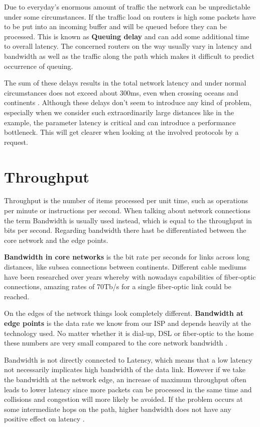 Due to everyday's enormous amount of traffic the network can be unpredictable under some circumstances. If the traffic load on routers is high some packets have to be put into an incoming buffer and will be queued before they can be processed. This is known as \textbf{Queuing delay} and can add some additional time to overall latency. The concerned routers on the way usually vary in latency and bandwidth as well as the traffic along the path which makes it difficult to predict occurrence of queuing.   

The sum of these delays results in the total network latency and under normal circumstances does not exceed about 300ms, even when crossing oceans and continents \cite{Grigorik_2013}. Although these delays don't seem to introduce any kind of problem, especially when we consider such extraordinarily large distances like in the example, the parameter latency is critical and can introduce a performance bottleneck. This will get clearer when looking at the involved protocols by a request.

\section{Throughput}
Throughput is the number of items processed per unit time, such as operations per minute or instructions per second. When talking about network connections the term Bandwidth is usually used instead, which is equal to the throughput in bits per second. 
Regarding bandwidth there hast be differentiated between the core network and the edge points. 

\textbf{Bandwidth in core networks} is the bit rate per seconds for links across long distances, like subsea connections between continents. Different cable mediums have been researched over years whereby with nowadays capabilities of fiber-optic connections, amazing rates of 70Tb/s for a single fiber-optic link could be reached.   

On the edges of the network things look completely different. \textbf{Bandwidth at edge points} is the data rate we know from our ISP and depends heavily at the technology used. No matter whether it is dial-up, DSL or fiber-optic to the home these numbers are very small compared to the core network bandwidth  \cite{Grigorik_2013}.

Bandwidth is not directly connected to Latency, which means that a low latency not necessarily implicates high bandwidth of the data link. However if we take the bandwidth at the network edge, an increase of maximum throughput often leads to lower latency since more packets can be processed in the same time and collisions and congestion will more likely be avoided. If the problem occurs at some intermediate hops on the path, higher bandwidth does not have any positive effect on latency \cite{Killelea_2002}.

